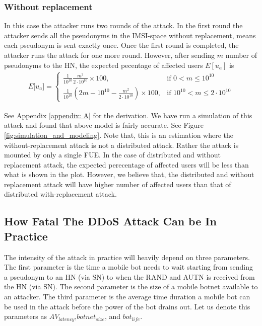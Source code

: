 \documentclass{llncs} %
\begin{document}
\subsubsection{Without replacement}
In this case the attacker runs two rounds of the attack. In the first round the attacker sends all the pseudonyms in the IMSI-space without replacement, means each pseudonym is sent exactly once. Once the first round is completed, the attacker runs the attack for one more round. However, after sending $m$ number of pseudonyms to the HN, the expected pecentage of affected users $E[u_a]$ is
\begin{eqnarray}
E\big[ u_a \big] = \begin{cases} \frac{1}{10^{10}}\frac{m^2}{2\cdot 10^{10}} \times 100, & \mbox{if } 0 < m \leq 10^{10} \\ 
\frac{1}{10^{10}}(2m - 10^{10} - \frac{m^2}{2\cdot 10^{10}}) \times 100, & \mbox{if } 10^{10} < m \leq 2\cdot 10^{10} \end{cases}
\label{eqn:without_replacement}
\end{eqnarray} 

See Appendix \ref{appendix: A} for the derivation. We have run a simulation of this attack and found that above model is fairly accurate. See Figure \ref{fig:simulation_and_modeling}. Note that, this is an estimation where the without-replacement attack is not a distributed attack. Rather the attack is mounted by only a single FUE. In the case of distributed and without replacement attack, the expected perecentage of affected users will be less than what is shown in the plot. However, we believe that, the distributed and without replacement attack will have higher number of affected users than that of distributed with-replacement attack.


\subsection{How Fatal The DDoS Attack Can be In Practice} \label{sec:how_fatal_ddos}
The intensity of the attack in practice will heavily depend on three parameters. The first parameter is the time a mobile bot needs to wait starting from sending a pseudonym to an HN (via SN) to when the RAND and AUTN is received from the HN (via SN). The second parameter is the size of a mobile botnet available to an attacker. The third parameter is the average time duration a mobile bot can be used in the attack before the power of the bot drains out. Let us denote this parameters as $AV_{latency}$,$botnet_{size}$, and $bot_{life}$. 
\end{document}
